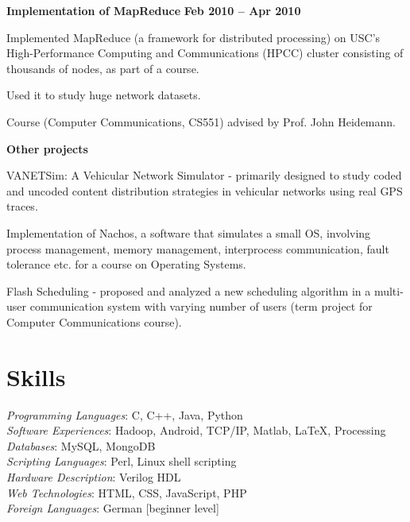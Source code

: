 \documentclass[margin,line]{resume}
\begin{document}
\begin{resume}

  \textbf{Implementation of MapReduce} \hfill \textbf{Feb 2010 -- Apr 2010}
  \begin{list2}
  \item Implemented MapReduce (a framework for distributed processing) on USC's High-Performance Computing and Communications (HPCC) cluster consisting of thousands of nodes, as part of a course. 
  \item Used it to study huge network datasets. 
  \item Course (Computer Communications, CS551) advised by Prof. John Heidemann. 
  \end{list2}
 
  \textbf{Other projects} 
  \begin{list2}   
   \item VANETSim: A Vehicular Network Simulator -  primarily designed to study coded and uncoded content distribution strategies in vehicular networks using real GPS traces.
   \item Implementation of Nachos, a software that simulates a small OS, involving process management, memory management, interprocess communication, fault tolerance etc. for a course on Operating Systems.
   \item Flash Scheduling - proposed and analyzed a new scheduling algorithm in a multi-user communication system with varying number of users (term project for Computer Communications course).
  \end{list2}

   

 \section{\mysidestyle Skills} 

    \textsl{Programming Languages}: C, C++, Java, Python\\
    \textsl{Software Experiences}: Hadoop, Android, TCP/IP, Matlab, \LaTeX, Processing\\
    \textsl{Databases}: MySQL, MongoDB\\
    \textsl{Scripting Languages}: Perl, Linux shell scripting \\
    \textsl{Hardware Description}: Verilog HDL \\
    \textsl{Web Technologies}: HTML, CSS, JavaScript, PHP \\
    \textsl{Foreign Languages}: German [beginner level]


\end{resume}
\end{document}
